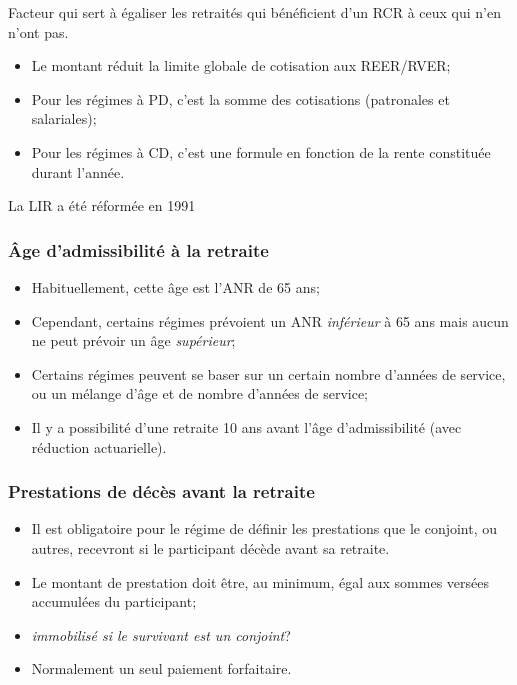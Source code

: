 \documentclass[10pt, french]{article}
\begin{document}
\begin{multicols*}{3}
\begin{definitionNOHFILL}
Facteur qui sert à égaliser les retraités qui bénéficient d'un RCR à ceux qui n'en n'ont pas.

\begin{itemize}[leftmargin = *]
	\item	Le montant réduit la limite globale de cotisation aux REER/RVER;
	\item	Pour les régimes à PD, c'est la somme des cotisations (patronales et salariales);
	\item	Pour les régimes à CD, c'est une formule en fonction de la rente constituée durant l'année.
\end{itemize}
\end{definitionNOHFILL}

La LIR a été réformée en 1991


\subsubsection*{Âge d'admissibilité à la retraite}
\begin{itemize}[leftmargin = *]
	\item	Habituellement, cette âge est l'ANR de 65 ans;
	\item	Cependant, certains régimes prévoient un ANR \textit{inférieur} à 65 ans mais aucun ne peut prévoir un âge \textit{supérieur};
	\item	Certains régimes peuvent se baser sur un certain nombre d'années de service, ou un mélange d'âge et de nombre d'années de service;
	\item	Il y a possibilité d'une retraite 10 ans avant l'âge d'admissibilité (avec réduction actuarielle).
\end{itemize}


\subsubsection*{Prestations de décès avant la retraite}
\begin{itemize}[leftmargin = *]
	\item	Il est obligatoire pour le régime de définir les prestations que le conjoint, ou autres, recevront si le participant décède avant sa retraite.
	\item	Le montant de prestation doit être, au minimum, égal aux sommes versées accumulées du participant;
	\item	\textit{immobilisé si le survivant est un conjoint}?
	\item	Normalement un seul paiement forfaitaire.
\end{itemize}


\end{multicols*}
\end{document}
